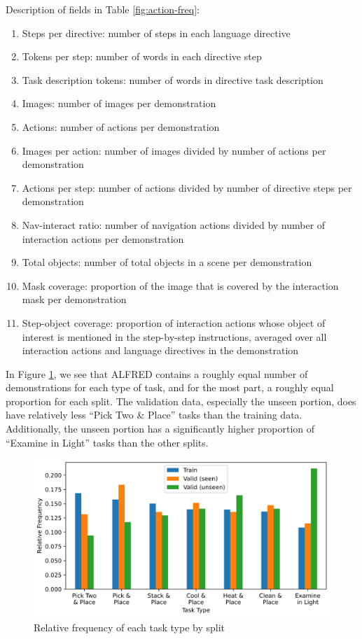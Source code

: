 \documentclass[11pt,a4paper]{article}
\begin{document}
Description of fields in Table \ref{fig:action-freq}:
\begin{enumerate}
    \item Steps per directive: number of steps in each language directive
    \item Tokens per step: number of words in each directive step
    \item Task description tokens: number of words in directive task description
    \item Images: number of images per demonstration
    \item Actions: number of actions per demonstration
    \item Images per action: number of images divided by number of actions per demonstration
    \item Actions per step: number of actions divided by number of directive steps per demonstration
    \item Nav-interact ratio: number of navigation actions divided by number of interaction actions per demonstration
    \item Total objects: number of total objects in a scene per demonstration
    \item Mask coverage: proportion of the image that is covered by the interaction mask per demonstration
    \item Step-object coverage: proportion of interaction actions whose object of interest is mentioned in the step-by-step instructions, averaged over all interaction actions and language directives in the demonstration
\end{enumerate}

In Figure \ref{fig:task-type}, we see that ALFRED contains a roughly equal number of demonstrations for each type of task, and for the most part, a roughly equal proportion for each split. The validation data, especially the unseen portion, does have relatively less ``Pick Two \& Place'' tasks than the training data. Additionally, the unseen portion has a significantly higher proportion of ``Examine in Light'' tasks than the other splits.

\begin{figure}[H]
\centering
\includegraphics[scale=0.33]{figures/task_type_freqs.png}
\caption{Relative frequency of each task type by split}
\label{fig:task-type}
\end{figure}
\end{document}
